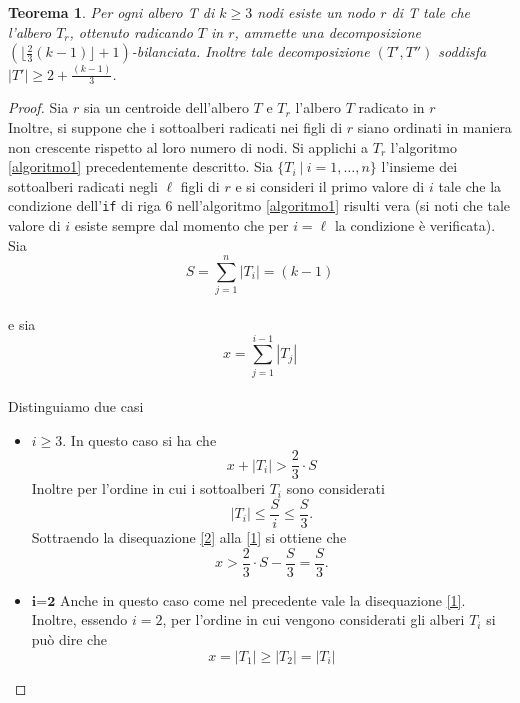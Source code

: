 \newtheorem{teorema1}[definizione]{Teorema}
\begin{teorema1}
	\label{teorema1 cap3 sez1}
Per ogni albero T di $k \ge 3$ nodi esiste un nodo $r$ di T  tale che l'albero $T_r$, ottenuto radicando $T$ in $r$, ammette una decomposizione $ (\lfloor \frac{2}{3}(k-1) \rfloor + 1)$-bilanciata. Inoltre tale decomposizione $ (T',T'')$ soddisfa $ |T'| \ge 2+\frac{(k-1)}{3} $.
\end{teorema1}
\begin{proof}
	Sia $r$ sia un centroide dell'albero $ T $ e $T_r$ l'albero $ T $ radicato in $ r $ \\  	Inoltre, si suppone che i sottoalberi radicati nei figli di $r$ siano ordinati in maniera non crescente rispetto al loro numero di nodi. 
	Si applichi a $ T_r $ l'algoritmo \ref{algoritmo1} precedentemente descritto. Sia $ \{T_i \ | \  i=1,\dots,n\} $ l'insieme dei sottoalberi radicati negli $\ell$ figli di $ r $ e si consideri il primo valore di $ i $ tale che la condizione dell'\texttt{if} di riga $ 6 $ nell'algoritmo \ref{algoritmo1} risulti vera (si noti che tale valore di $ i $ esiste sempre dal momento che per $ i = \ell $ la condizione \`e verificata).
	Sia 
	\[ S = \sum_{j=1}^{n}{|T_i|} = (k-1 ) \]\\
	e sia
	\[ x = \sum_{j=1}^{i-1}{|T_j|} \]\\
	Distinguiamo due casi
	\begin{itemize}
	\item $i \ge 3$. In questo caso si ha che
	\begin{equation}\label{1}
		x+|T_i| > \frac{2}{3}\cdot S
	\end{equation}
	Inoltre per l'ordine in cui i sottoalberi $ T_i $ sono considerati
	\begin{equation}\label{2}
	|T_i| \le \frac{S}{i} \le \frac{S}{3}	.
	\end{equation}
	Sottraendo la disequazione \eqref{2} alla \eqref{1} si ottiene che 
	\begin{equation}\label{3}
	x > \frac{2}{3}\cdot S - \frac{S}{3} = \frac{S}{3}.
	\end{equation}
 	\item $ \textbf{i=2} $ Anche in questo caso come nel precedente vale la disequazione \eqref{1}.\\
 	Inoltre, essendo $ i = 2 $, per l'ordine in cui vengono considerati gli alberi $T_i$ si pu\`o dire che
 	\begin{equation}\label{4}
 	x = |T_1| \ge |T_2| = |T_i|
 	\end{equation}

\end{itemize}
\end{proof}
